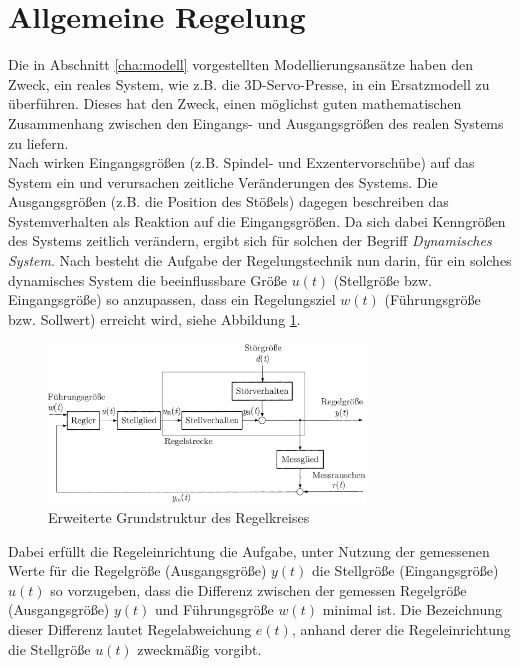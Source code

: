 \section{Allgemeine Regelung}


Die in Abschnitt \ref{cha:modell} vorgestellten Modellierungsansätze haben den Zweck, ein reales System, wie z.B. die 3D-Servo-Presse, in ein Ersatzmodell zu überführen. Dieses hat den Zweck, einen möglichst guten mathematischen Zusammenhang zwischen den Eingangs- und Ausgangsgrößen des realen Systems zu liefern. \\
Nach \cite{Lunze.2013} wirken Eingangsgrößen (z.B. Spindel- und Exzentervorschübe) auf das System ein und verursachen zeitliche Veränderungen des Systems. Die Ausgangsgrößen (z.B. die Position des Stößels) dagegen beschreiben das Systemverhalten als Reaktion auf die Eingangsgrößen. Da sich dabei Kenngrößen des Systems zeitlich verändern, ergibt sich für solchen der Begriff \textit{Dynamisches System}. Nach \cite{Lunze.2013} besteht die Aufgabe der Regelungstechnik nun darin, für ein solches dynamisches System die beeinflussbare Größe $u(t)$ (Stellgröße bzw. Eingangsgröße) so anzupassen, dass ein Regelungsziel $w(t)$ (Führungsgröße bzw. Sollwert) erreicht wird, siehe Abbildung \ref{fig:regelkreis}.

\begin{figure} 
	\centering
	\includegraphics[width=0.75\textwidth]{images/Regelkreis}
	\caption{Erweiterte Grundstruktur des Regelkreises \cite{Lunze.2013}}
	\label{fig:regelkreis}
\end{figure}




Dabei erfüllt die Regeleinrichtung die Aufgabe, unter Nutzung der gemessenen Werte für die Regelgröße (Ausgangsgröße) $y(t)$ die Stellgröße (Eingangsgröße) $u(t)$ so vorzugeben, dass die Differenz zwischen der gemessen Regelgröße (Ausgangsgröße) $y(t)$ und Führungsgröße $w(t)$ minimal ist.  Die Bezeichnung dieser Differenz lautet Regelabweichung $e(t)$, anhand derer die Regeleinrichtung die Stellgröße $u(t)$ zweckmäßig vorgibt. \cite{Lunze.2013}
  
